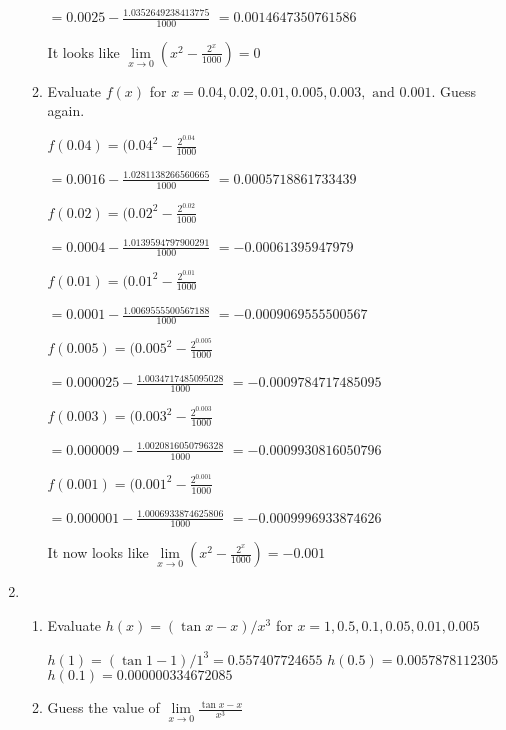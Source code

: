 \documentclass{article}
\begin{document}
\begin{enumerate}
\begin{enumerate}
				$= 0.0025 - \frac{1.0352649238413775}{1000}$
				$= 0.0014647350761586$
				
				It looks like $\lim \limits _{x \to 0} (x^2 - \frac{2^x}{1000}) = 0$
					
				\item Evaluate $f(x)$ for $x = 0.04, 0.02, 0.01, 0.005, 0.003, \text{ and } 0.001$. Guess again.
				
				$f(0.04)  = (0.04^2 - \frac{2^{0.04}}{1000} $
				
				$= 0.0016 - \frac{1.0281138266560665}{1000}$
				$ = 0.0005718861733439$
				
				$f(0.02) = (0.02^2 - \frac{2^{0.02}}{1000}$
				
				$ = 0.0004 - \frac{1.0139594797900291}{1000}$
				$ = -0.00061395947979$
				
				$f(0.01) = (0.01^2 - \frac{2^{0.01}}{1000} $
				
				$= 0.0001 - \frac{1.0069555500567188}{1000}$
				$ = -0.0009069555500567$
				
				$f(0.005) = (0.005^2 - \frac{2^{0.005}}{1000} $
				
				$= 0.000025 - \frac{1.0034717485095028}{1000}$
				$ = -0.0009784717485095$
				
				$f(0.003) = (0.003^2 - \frac{2^{0.003}}{1000} $
				
				$= 0.000009 - \frac{1.0020816050796328}{1000}$
				$ = -0.0009930816050796$
				
				$f(0.001) = (0.001^2 - \frac{2^{0.001}}{1000} $
				
				$= 0.000001 - \frac{1.0006933874625806}{1000}$
				$ = -0.0009996933874626$
				
				It now looks like  $\lim \limits _{x \to 0} (x^2 - \frac{2^x}{1000}) = -0.001$
			\end{enumerate}
			
			\item 
			
			\begin{enumerate}
			
				\item Evaluate $h(x) = (\tan x - x)/x^3$ for
				$x = 1, 0.5, 0.1, 0.05, 0.01, 0.005$
				
				$h(1) = (\tan 1 - 1)/1^3 = 0.557407724655$
				$h(0.5) = 0.0057878112305$
				$h(0.1) = 0.000000334672085$
				
				\item Guess the value of $\lim \limits _{x \to 0} \frac{\tan x - x}{x^3}$
				

\end{enumerate}
\end{enumerate}
\end{document}
